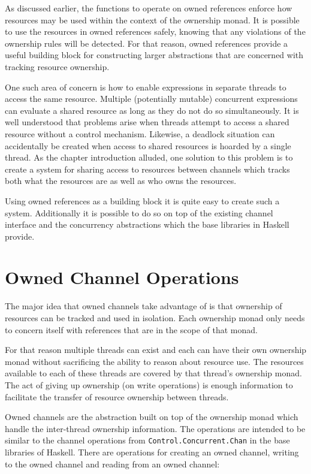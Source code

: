 \documentclass[onehalf,11pt]{beavtex}
\begin{document}
As discussed earlier, the functions to operate on owned references enforce
how resources may be used within the context of the ownership monad.
It is possible to use the resources in owned references safely, knowing that any
violations of the ownership rules will be detected.
For that reason, owned references provide a useful building block for constructing
larger abstractions that are concerned with tracking resource ownership.

One such area of concern is how to enable expressions in separate
threads to access the same resource.
Multiple (potentially mutable) concurrent expressions can evaluate a shared
resource as long as they do not do so simultaneously.
It is well understood that problems arise when threads attempt to access a
shared resource without a control mechanism.
Likewise, a deadlock situation can accidentally be created
when access to shared resources is hoarded by a single thread.
As the chapter introduction alluded, one solution to this problem is to
create a system for sharing access to resources between channels which tracks
both what the resources are as well as who owns the resources.

Using owned references as a building block it is quite easy to create
such a system.  Additionally it is possible to do so on top of the existing
channel interface and the concurrency abstractions which the base libraries
in Haskell provide.

\section{Owned Channel Operations}

The major idea that owned channels take advantage of is that ownership
of resources can be tracked and used in isolation. Each ownership monad only
needs to concern itself with references that are in the scope of that monad.

For that reason multiple threads can exist and each can have their own
ownership monad without sacrificing the ability to reason about resource use.
The resources available to each of these threads are covered by that thread's
ownership monad.
The act of giving up ownership (on write operations) is enough information to
facilitate the transfer of resource ownership between threads.

Owned channels are the abstraction built on top of the ownership monad which
handle the inter-thread ownership information. The operations are intended
to be similar to the channel operations from \texttt{Control.Concurrent.Chan}
in the base libraries of Haskell. There are operations for creating an owned
channel, writing to the owned channel and reading from an owned channel:
\end{document}

